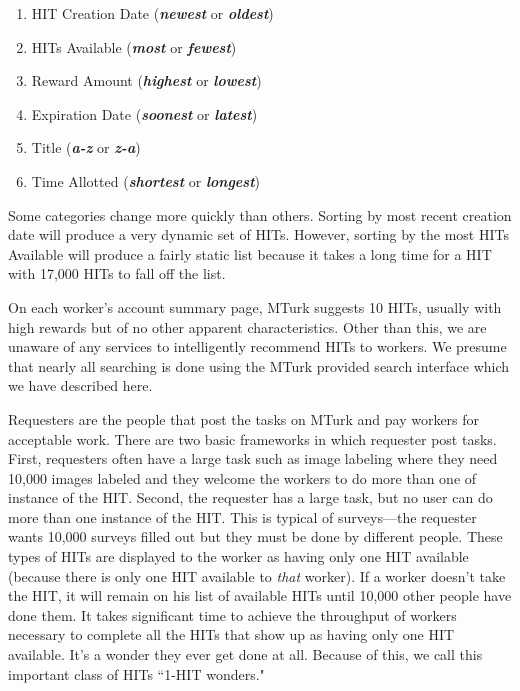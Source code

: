 \documentclass{acm_proc_article-sp}
\begin{document}
\begin{enumerate}
\item HIT Creation Date ({\bfseries {\em newest}} or {\bfseries {\em oldest}})
\item HITs Available ({\bfseries {\em most}} or {\bfseries {\em fewest}})
\item Reward Amount ({\bfseries {\em highest}} or {\bfseries {\em lowest}})
\item Expiration Date ({\bfseries {\em soonest}} or {\bfseries {\em latest}})
\item Title ({\bfseries {\em a-z}} or {\bfseries {\em z-a}})
\item Time Allotted ({\bfseries {\em shortest}} or {\bfseries {\em longest}})
\end{enumerate}

Some categories change more quickly than others.  Sorting by most
recent creation date will produce a very dynamic set of HITs.
However, sorting by the most HITs Available will produce a fairly
static list because it takes a long time for a HIT with 17,000 HITs to
fall off the list.

On each worker's account summary page, MTurk suggests 10 HITs, usually
with high rewards but of no other apparent characteristics.  Other
than this, we are unaware of any services to intelligently recommend
HITs to workers.  We presume that nearly all searching is done using
the MTurk provided search interface which we have described here.

Requesters are the people that post the tasks on MTurk and pay workers
for acceptable work.  There are two basic frameworks in which
requester post tasks.  First, requesters often have a large task such
as image labeling where they need 10,000 images labeled and they welcome
the workers to do more than one of instance of the HIT.  Second, the
requester has a large task, but no user can do more than one instance
of the HIT.  This is typical of surveys---the requester wants 10,000
surveys filled out but they must be done by different people.  These
types of HITs are displayed to the worker as having only one HIT
available (because there is only one HIT available to \emph{that}
worker).  If a worker doesn't take the HIT, it will remain on his list
of available HITs until 10,000 other people have done them.  It takes
significant time to achieve the throughput of workers necessary to
complete all the HITs that show up as having only one HIT available.
It's a wonder they ever get done at all.  Because of this, we call
this important class of HITs ``1-HIT wonders."
\end{document}

